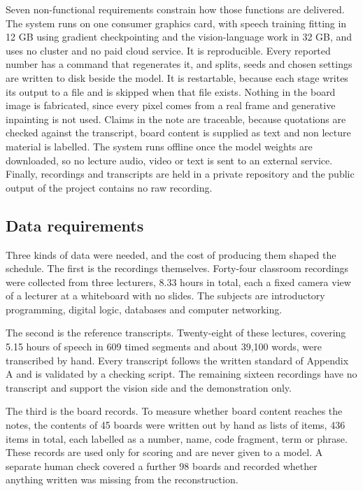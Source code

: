 Seven non-functional requirements constrain how those functions are delivered. The system
runs on one consumer graphics card, with speech training fitting in 12 GB using gradient
checkpointing and the vision-language work in 32 GB, and uses no cluster and no paid
cloud service. It is reproducible. Every reported number has a command that regenerates
it, and splits, seeds and chosen settings are written to disk beside the model. It is
restartable, because each stage writes its output to a file and is skipped when that file
exists. Nothing in the board image is fabricated, since every pixel comes from a real
frame and generative inpainting is not used. Claims in the note are traceable, because
quotations are checked against the transcript, board content is supplied as text and non
lecture material is labelled. The system runs offline once the model weights are
downloaded, so no lecture audio, video or text is sent to an external service. Finally,
recordings and transcripts are held in a private repository and the public output of the
project contains no raw recording.

\subsection{Data requirements}

Three kinds of data were needed, and the cost of producing them shaped the schedule. The
first is the recordings themselves. Forty-four classroom recordings were collected from
three lecturers, 8.33 hours in total, each a fixed camera view of a lecturer at a
whiteboard with no slides. The subjects are introductory programming, digital logic,
databases and computer networking.

The second is the reference transcripts. Twenty-eight of these lectures, covering 5.15
hours of speech in 609 timed segments and
about 39,100 words, were transcribed by hand. Every transcript follows the written
standard of Appendix A and is validated by a checking script. The remaining sixteen
recordings have no transcript and support the vision side and the demonstration only.

The third is the board records. To measure whether board content reaches the notes,
the contents of 45 boards were
written out by hand as lists of items, 436 items in total, each labelled as a number,
name, code fragment, term or phrase. These records are used only for scoring and are
never given to a model. A separate human check covered a further 98 boards and recorded
whether anything written was missing from the reconstruction.

